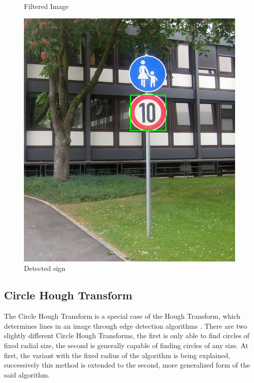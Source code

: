\begin{figure}[H]
	\caption{Filtered Image}\label{fig:red_filtered_image}
	\endminipage\hfill
	\includegraphics[width=\linewidth]{images/detectedimg.png}
	\caption{Detected sign}\label{fig:detected_image}
	\endminipage
\end{figure}



\subsection{Circle Hough Transform}
The Circle Hough Transform is a special case of the Hough Transform, which determines lines in an image through edge detection algorithms \cite{circlehough}. There are two slightly different Circle Hough Transforms, the first is only able to find circles of fixed radial size, the second is generally capable of finding circles of any size. At first, the variant with the fixed radius of the algorithm is being explained, successively this method is extended to the second, more generalized form of the said algorithm.


